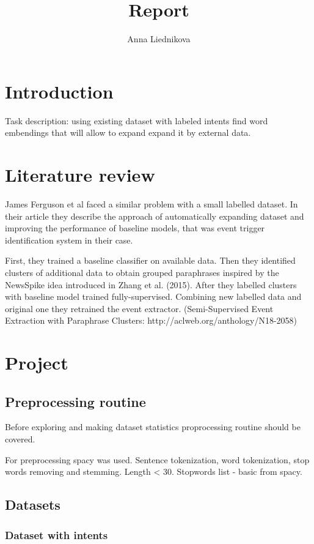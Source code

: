 \documentclass[11pt]{article}
\title{Report}
\author{Anna Liednikova}
\begin{document}
\section{Introduction}

Task description: using existing dataset with labeled intents find word embendings that will allow to expand expand it by external data.

\section{Literature review}

\cite{N18-2058} James Ferguson et al faced a similar problem with a small labelled dataset. In their article they describe the approach of automatically expanding dataset and improving the performance of baseline models, that was event trigger identification system in their case.

First, they trained a baseline classifier on available data. Then they identified clusters of additional data to obtain grouped paraphrases inspired by the NewsSpike idea introduced in Zhang et al. (2015). After they labelled clusters with baseline model trained fully-supervised. Combining new labelled data and original one they retrained the event extractor. (Semi-Supervised Event Extraction with Paraphrase Clusters: http://aclweb.org/anthology/N18-2058)



\section{Project}

\subsection{Preprocessing routine}

Before exploring and making dataset statistics proprocessing routine should be covered.

For preprocessing spacy was used. Sentence tokenization, word tokenization, stop words removing and stemming. Length < 30. Stopwords list - basic from spacy.

\subsection{Datasets}

\subsubsection{Dataset with intents}
\end{document}
